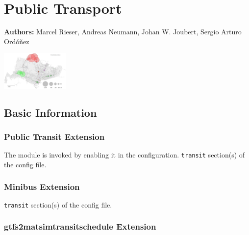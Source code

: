 \chapter*{Public Transport}
\label{ch:pt}

\hfill \textbf{Authors:} Marcel Rieser, Andreas Neumann, Johan W. Joubert, Sergio Arturo Ordóñez

\begin{center} \includegraphics[width=0.25\textwidth, angle=0]{extending/figures/ebr/Backwards.png} \end{center}


\section{Basic Information}

\subsection{Public Transit Extension}

\createStandardInformationBasic%
{}%
{The module is invoked by enabling it in the configuration.}%
{\lstinline{transit} section(s) of the config file.}%
{\citet{Rieser2010}}


\subsection{Minibus Extension}

\createStandardInformationBasic%
{}%
{}%
{\lstinline{transit} section(s) of the config file.}%
{\citet{Neumann2014PhD}}

\subsection{gtfs2matsimtransitschedule Extension}

